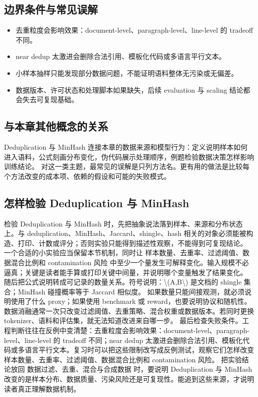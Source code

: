 \documentclass[a4paper]{article}
\begin{document}
\subsection{边界条件与常见误解}
\begin{itemize}
\item 去重粒度会影响效果：document-level、paragraph-level、line-level 的 tradeoff 不同。
\item near dedup 太激进会删除合法引用、模板化代码或多语言平行文本。
\item 小样本抽样只能发现部分数据问题，不能证明语料整体无污染或无偏差。
\item 数据版本、许可状态和处理脚本如果缺失，后续 evaluation 与 scaling 结论都会失去可复现基础。
\end{itemize}
\subsection{与本章其他概念的关系}
Deduplication 与 MinHash 连接本章的数据来源和模型行为：定义说明样本如何进入语料，公式刻画分布变化，伪代码展示处理顺序，例题检验数据决策怎样影响训练结论。
对这一类主题，最常见的误解是只列方法名。更有用的做法是比较每个方法改变的成本项、依赖的假设和可能的失败模式。
\subsection{怎样检验 Deduplication 与 MinHash}
检验 Deduplication 与 MinHash 时，先把抽象说法落到样本、来源和分布状态上。与 deduplication、MinHash、Jaccard、shingle、hash 相关的对象必须能被构造、打印、计数或评分；否则实验只能得到描述性观察，不能得到可复现结论。
一个合适的小实验应当保留本节机制，同时让 样本数量、去重率、过滤阈值、数据混合比例和 contamination 风险 中至少一个量发生可解释变化。输入规模不必逼真；关键是读者能手算或打印关键中间量，并说明哪个变量触发了结果变化。
随后把公式说明转成可记录的数量关系。符号说明：\textbackslash{}(A,B\textbackslash{}) 是文档的 shingle 集合；MinHash 碰撞概率等于 Jaccard 相似度。 如果数量只能间接观测，就必须说明使用了什么 proxy；如果使用 benchmark 或 reward，也要说明协议和随机性。
数据消融通常一次只改变过滤阈值、去重策略、混合权重或数据版本。若同时更换 tokenizer、语料和评估集，就无法知道改进来自哪一步。
最后检查失败条件。工程判断往往在反例中变清楚：去重粒度会影响效果：document-level、paragraph-level、line-level 的 tradeoff 不同；near dedup 太激进会删除合法引用、模板化代码或多语言平行文本。复习时可以把这些限制改写成反例测试，观察它们怎样改变 样本数量、去重率、过滤阈值、数据混合比例和 contamination 风险。
把实验结论放回 数据过滤、去重、混合与合成数据 时，要说明 Deduplication 与 MinHash 改变的是样本分布、数据质量、污染风险还是可复现性。能追到这些来源，才说明读者真正理解数据机制。
\end{document}
